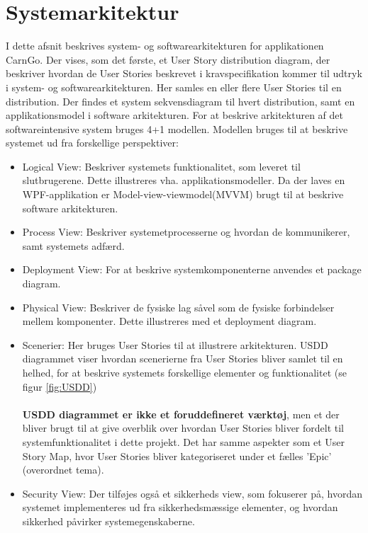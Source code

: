 \documentclass[a4paper,12pt,fleqn,oneside]{article}
\begin{document}
\label{architecture}


 \newpage
\tableofcontents
\newpage
\section{Systemarkitektur}
I dette afsnit beskrives system- og softwarearkitekturen for applikationen CarnGo. Der vises, som det første, et User Story distribution diagram, der beskriver hvordan de User Stories beskrevet i kravspecifikation kommer til udtryk i system- og softwarearkitekturen. Her samles en eller flere User Stories til en distribution. Der findes et system sekvensdiagram til hvert distribution, samt en applikationsmodel i software arkitekturen. For at beskrive arkitekturen af det softwareintensive system bruges 4+1 modellen. Modellen bruges til at beskrive systemet ud fra forskellige perspektiver:
\begin{itemize}
    \item Logical View: Beskriver systemets funktionalitet, som leveret til slutbrugerene. Dette illustreres vha. applikationsmodeller. Da der laves en WPF-applikation er Model-view-viewmodel(MVVM) brugt til at beskrive software arkitekturen. 
    \item Process View: Beskriver systemetprocesserne og hvordan de kommunikerer, samt systemets adfærd. 
    \item Deployment View: For at beskrive systemkomponenterne anvendes et package diagram. 
    \item Physical View: Beskriver de fysiske lag såvel som de fysiske forbindelser mellem komponenter. Dette illustreres med et deployment diagram. 
    \item Scenerier: Her bruges User Stories til at illustrere arkitekturen. USDD diagrammet viser hvordan scenerierne fra User Stories bliver samlet til en helhed, for at beskrive systemets forskellige elementer og funktionalitet (se figur \ref{fig:USDD}) \\\\
    \textbf{USDD diagrammet er ikke et foruddefineret værktøj}, men et der bliver brugt til at give overblik over hvordan User Stories bliver fordelt til systemfunktionalitet i dette projekt. Det har samme aspekter som et User Story Map, hvor User Stories bliver kategoriseret under et fælles 'Epic' (overordnet tema).
    \item Security View: Der tilføjes også et sikkerheds view, som fokuserer på, hvordan systemet implementeres ud fra sikkerhedsmæssige elementer, og hvordan sikkerhed påvirker systemegenskaberne. 
\end{itemize} \newpage 
\end{document}
